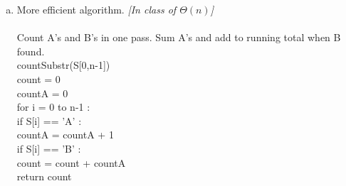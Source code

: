 \documentclass[11pt]{article}
\begin{document}
\begin{enumerate}
\begin{enumerate}[(a)]
			\item More efficient algorithm. \textit{[In class of $ \Theta(n) $]}\\\\
				Count A's and B's in one pass. Sum A's and add to running total when B found. \\
				countSubstr(S[0,n-1]) \\
					\hspace*{.4cm}
					count = 0 \\
					\hspace*{.4cm}
					countA = 0 \\
					\hspace*{.4cm}
					for i = 0 to n-1 : \\
						\hspace*{.8cm}
						if S[i] == 'A' : \\
							\hspace*{1.2cm}
							countA = countA + 1 \\
						\hspace*{.8cm}
						if S[i] == 'B' : \\
							\hspace*{1.2cm}
							count = count + countA \\
					return count \\\\
				
		\end{enumerate}


\end{enumerate}
\end{document}
